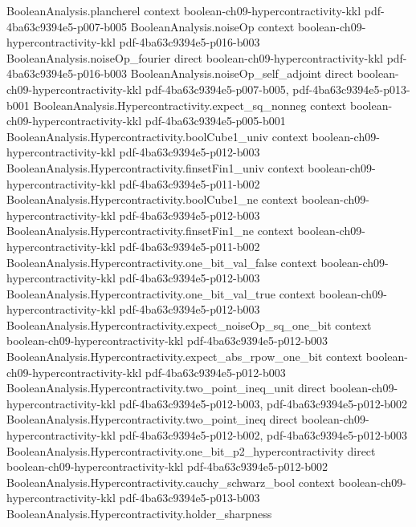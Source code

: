 \begin{theorem}
\proofstep
  {BooleanAnalysis.plancherel}
  {context}
  {boolean-ch09-hypercontractivity-kkl}
  {pdf-4ba63c9394e5-p007-b005}
\proofstep
  {BooleanAnalysis.noiseOp}
  {context}
  {boolean-ch09-hypercontractivity-kkl}
  {pdf-4ba63c9394e5-p016-b003}
\proofstep
  {BooleanAnalysis.noiseOp_fourier}
  {direct}
  {boolean-ch09-hypercontractivity-kkl}
  {pdf-4ba63c9394e5-p016-b003}
\proofstep
  {BooleanAnalysis.noiseOp_self_adjoint}
  {direct}
  {boolean-ch09-hypercontractivity-kkl}
  {pdf-4ba63c9394e5-p007-b005,
    pdf-4ba63c9394e5-p013-b001}
\proofstep
  {BooleanAnalysis.Hypercontractivity.expect_sq_nonneg}
  {context}
  {boolean-ch09-hypercontractivity-kkl}
  {pdf-4ba63c9394e5-p005-b001}
\proofstep
  {BooleanAnalysis.Hypercontractivity.boolCube1_univ}
  {context}
  {boolean-ch09-hypercontractivity-kkl}
  {pdf-4ba63c9394e5-p012-b003}
\proofstep
  {BooleanAnalysis.Hypercontractivity.finsetFin1_univ}
  {context}
  {boolean-ch09-hypercontractivity-kkl}
  {pdf-4ba63c9394e5-p011-b002}
\proofstep
  {BooleanAnalysis.Hypercontractivity.boolCube1_ne}
  {context}
  {boolean-ch09-hypercontractivity-kkl}
  {pdf-4ba63c9394e5-p012-b003}
\proofstep
  {BooleanAnalysis.Hypercontractivity.finsetFin1_ne}
  {context}
  {boolean-ch09-hypercontractivity-kkl}
  {pdf-4ba63c9394e5-p011-b002}
\proofstep
  {BooleanAnalysis.Hypercontractivity.one_bit_val_false}
  {context}
  {boolean-ch09-hypercontractivity-kkl}
  {pdf-4ba63c9394e5-p012-b003}
\proofstep
  {BooleanAnalysis.Hypercontractivity.one_bit_val_true}
  {context}
  {boolean-ch09-hypercontractivity-kkl}
  {pdf-4ba63c9394e5-p012-b003}
\proofstep
  {BooleanAnalysis.Hypercontractivity.expect_noiseOp_sq_one_bit}
  {context}
  {boolean-ch09-hypercontractivity-kkl}
  {pdf-4ba63c9394e5-p012-b003}
\proofstep
  {BooleanAnalysis.Hypercontractivity.expect_abs_rpow_one_bit}
  {context}
  {boolean-ch09-hypercontractivity-kkl}
  {pdf-4ba63c9394e5-p012-b003}
\proofstep
  {BooleanAnalysis.Hypercontractivity.two_point_ineq_unit}
  {direct}
  {boolean-ch09-hypercontractivity-kkl}
  {pdf-4ba63c9394e5-p012-b003,
    pdf-4ba63c9394e5-p012-b002}
\proofstep
  {BooleanAnalysis.Hypercontractivity.two_point_ineq}
  {direct}
  {boolean-ch09-hypercontractivity-kkl}
  {pdf-4ba63c9394e5-p012-b002,
    pdf-4ba63c9394e5-p012-b003}
\proofstep
  {BooleanAnalysis.Hypercontractivity.one_bit_p2_hypercontractivity}
  {direct}
  {boolean-ch09-hypercontractivity-kkl}
  {pdf-4ba63c9394e5-p012-b002}
\proofstep
  {BooleanAnalysis.Hypercontractivity.cauchy_schwarz_bool}
  {context}
  {boolean-ch09-hypercontractivity-kkl}
  {pdf-4ba63c9394e5-p013-b003}
\proofstep
  {BooleanAnalysis.Hypercontractivity.holder_sharpness}

\end{theorem}
